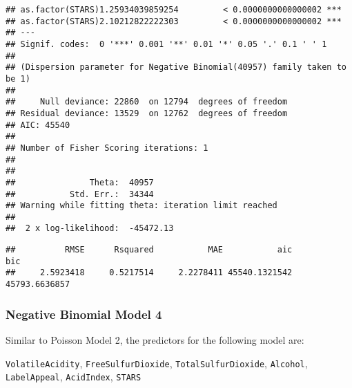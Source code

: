\documentclass[
]{article}
\begin{document}
\begin{verbatim}
## as.factor(STARS)1.25934039859254         < 0.0000000000000002 ***
## as.factor(STARS)2.10212822222303         < 0.0000000000000002 ***
## ---
## Signif. codes:  0 '***' 0.001 '**' 0.01 '*' 0.05 '.' 0.1 ' ' 1
## 
## (Dispersion parameter for Negative Binomial(40957) family taken to be 1)
## 
##     Null deviance: 22860  on 12794  degrees of freedom
## Residual deviance: 13529  on 12762  degrees of freedom
## AIC: 45540
## 
## Number of Fisher Scoring iterations: 1
## 
## 
##               Theta:  40957 
##           Std. Err.:  34344 
## Warning while fitting theta: iteration limit reached 
## 
##  2 x log-likelihood:  -45472.13
\end{verbatim}

\begin{verbatim}
##          RMSE      Rsquared           MAE           aic           bic 
##     2.5923418     0.5217514     2.2278411 45540.1321542 45793.6636857
\end{verbatim}

\hypertarget{negative-binomial-model-4}{%
\subsubsection{Negative Binomial Model
4}\label{negative-binomial-model-4}}

Similar to Poisson Model 2, the predictors for the following model are:

\texttt{VolatileAcidity}, \texttt{FreeSulfurDioxide},
\texttt{TotalSulfurDioxide}, \texttt{Alcohol}, \texttt{LabelAppeal},
\texttt{AcidIndex}, \texttt{STARS}
\end{document}
